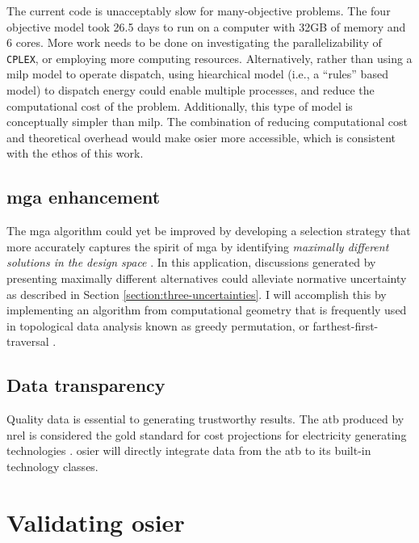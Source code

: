 The current code is unacceptably slow for many-objective problems. The four
objective model took 26.5 days to run on a computer with 32GB of memory and 6
cores. More work needs to be done on investigating the parallelizability of
\texttt{CPLEX}, or employing more computing resources. Alternatively, rather
than using a \ac{milp} model to operate dispatch, using hiearchical model (i.e.,
a ``rules'' based model) to dispatch energy could enable multiple processes, and
reduce the computational cost of the problem. Additionally, this type of model
is conceptually simpler than \ac{milp}. The combination of reducing
computational cost and theoretical overhead would make \ac{osier} more
accessible, which is consistent with the ethos of this work.


\subsection{\ac{mga} enhancement}

The \ac{mga} algorithm could yet be improved by developing a selection strategy
that more accurately captures the spirit of \ac{mga} by identifying 
\textit{maximally different solutions in the design space} 
\cite{decarolis_using_2011,yue_review_2018}. In this application, discussions
generated by presenting maximally different alternatives could alleviate
normative uncertainty as described in Section \ref{section:three-uncertainties}.
I will accomplish this by implementing an algorithm from computational geometry
that is frequently used in topological data analysis known as greedy
permutation, or farthest-first-traversal
\cite{cavanna_geometric_2015,eppstein_approximate_2020}.


\subsection{Data transparency}

Quality data is essential to generating trustworthy results. The \ac{atb}
produced by \ac{nrel} is considered the gold standard for cost projections for
electricity generating technologies \cite{nrel_2020_2020}. \ac{osier} will
directly integrate data from the \ac{atb} to its built-in technology classes.


\section{Validating \ac{osier}}

